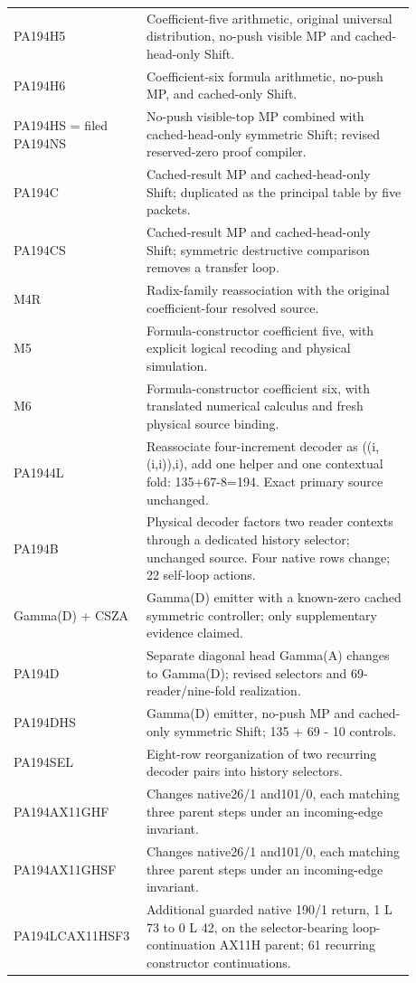 \begin{longtable}{p{0.24\linewidth}p{0.64\linewidth}}
PA194H5 & Coefficient-five arithmetic, original universal distribution, no-push visible MP and cached-head-only Shift.\\[4pt]
PA194H6 & Coefficient-six formula arithmetic, no-push MP, and cached-only Shift.\\[4pt]
PA194HS = filed PA194NS & No-push visible-top MP combined with cached-head-only symmetric Shift; revised reserved-zero proof compiler.\\[4pt]
PA194C & Cached-result MP and cached-head-only Shift; duplicated as the principal table by five packets.\\[4pt]
PA194CS & Cached-result MP and cached-head-only Shift; symmetric destructive comparison removes a transfer loop.\\[4pt]
M4R & Radix-family reassociation with the original coefficient-four resolved source.\\[4pt]
M5 & Formula-constructor coefficient five, with explicit logical recoding and physical simulation.\\[4pt]
M6 & Formula-constructor coefficient six, with translated numerical calculus and fresh physical source binding.\\[4pt]
PA1944L & Reassociate four-increment decoder as ((i,(i,i)),i), add one helper and one contextual fold: 135+67-8=194. Exact primary source unchanged.\\[4pt]
PA194B & Physical decoder factors two reader contexts through a dedicated history selector; unchanged source. Four native rows change; 22 self-loop actions.\\[4pt]
Gamma(D) + CSZA & Gamma(D) emitter with a known-zero cached symmetric controller; only supplementary evidence claimed.\\[4pt]
PA194D & Separate diagonal head Gamma(A) changes to Gamma(D); revised selectors and 69-reader/nine-fold realization.\\[4pt]
PA194DHS & Gamma(D) emitter, no-push MP and cached-only symmetric Shift; 135 + 69 - 10 controls.\\[4pt]
PA194SEL & Eight-row reorganization of two recurring decoder pairs into history selectors.\\[4pt]
PA194AX11GHF & Changes native26/1 and101/0, each matching three parent steps under an incoming-edge invariant.\\[4pt]
PA194AX11GHSF & Changes native26/1 and101/0, each matching three parent steps under an incoming-edge invariant.\\[4pt]
PA194LCAX11HSF3 & Additional guarded native 190/1 return, 1 L 73 to 0 L 42, on the selector-bearing loop-continuation AX11H parent; 61 recurring constructor continuations.\\[4pt]

\end{longtable}
